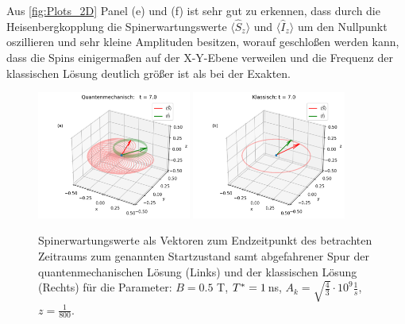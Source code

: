 Aus \autoref{fig:Plots_2D} Panel (e) und (f) ist sehr gut zu erkennen, dass durch die Heisenbergkopplung die Spinerwartungswerte $\langle\hat{S}_z \rangle$ 
und $\langle\hat{I}_z \rangle$ um den Nullpunkt oszillieren und sehr kleine Amplituden besitzen, worauf geschloßen werden kann, dass die 
Spins einigermaßen auf der X-Y-Ebene verweilen und die Frequenz der klassischen Lösung deutlich größer ist als bei der Exakten.
\begin{figure}[h!]
    \centering
    \includegraphics[width = 0.45\textwidth]{Abbildungen/Plot_Vektor_Quant_index.png}
    \includegraphics[width = 0.45\textwidth]{Abbildungen/Plot_Vektor_Klassisch_index.png}
    \caption{Spinerwartungswerte als Vektoren zum Endzeitpunkt des betrachten Zeitraums zum genannten Startzustand samt abgefahrener Spur der
    quantenmechanischen Lösung (Links) und der klassischen Lösung (Rechts) für die Parameter: $B = 0.5$ T, $T^*= 1 \thinspace$ns, $A_k = \sqrt{\frac{4}{3}}\cdot 10^9 \frac{1}{s}$,
    $z=\frac{1}{800}$.}
    \label{fig:Plots_3D}
\end{figure}

